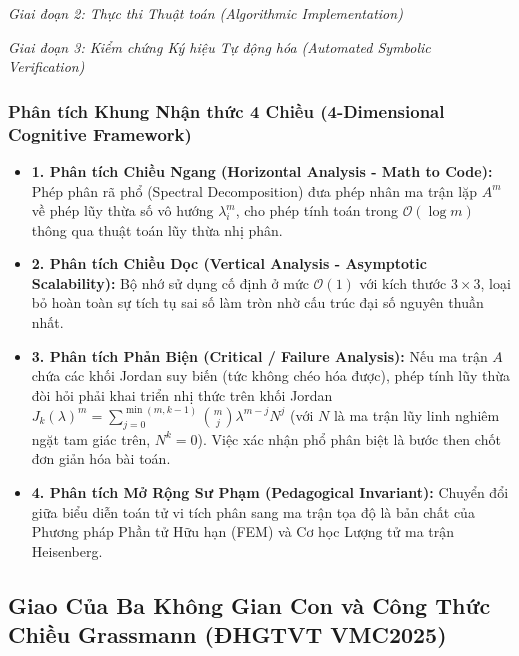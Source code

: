 \documentclass{article}
\begin{document}
\vspace{0.5em}\noindent\emph{Giai đoạn 2: Thực thi Thuật toán (Algorithmic Implementation)}


\vspace{0.5em}\noindent\emph{Giai đoạn 3: Kiểm chứng Ký hiệu Tự động hóa (Automated Symbolic Verification)}


\subsubsection*{Phân tích Khung Nhận thức 4 Chiều (4-Dimensional Cognitive Framework)}
\begin{itemize}
    \item \textbf{1. Phân tích Chiều Ngang (Horizontal Analysis - Math to Code):} Phép phân rã phổ (Spectral Decomposition) đưa phép nhân ma trận lặp $A^m$ về phép lũy thừa số vô hướng $\lambda_i^m$, cho phép tính toán trong $\mathcal{O}(\log m)$ thông qua thuật toán lũy thừa nhị phân.
    \item \textbf{2. Phân tích Chiều Dọc (Vertical Analysis - Asymptotic Scalability):} Bộ nhớ sử dụng cố định ở mức $\mathcal{O}(1)$ với kích thước $3 \times 3$, loại bỏ hoàn toàn sự tích tụ sai số làm tròn nhờ cấu trúc đại số nguyên thuần nhất.
    \item \textbf{3. Phân tích Phản Biện (Critical / Failure Analysis):} Nếu ma trận $A$ chứa các khối Jordan suy biến (tức không chéo hóa được), phép tính lũy thừa đòi hỏi phải khai triển nhị thức trên khối Jordan $J_k(\lambda)^m = \sum_{j=0}^{\min(m, k-1)} \binom{m}{j} \lambda^{m-j} N^j$ (với $N$ là ma trận lũy linh nghiêm ngặt tam giác trên, $N^k = 0$). Việc xác nhận phổ phân biệt là bước then chốt đơn giản hóa bài toán.
    \item \textbf{4. Phân tích Mở Rộng Sư Phạm (Pedagogical Invariant):} Chuyển đổi giữa biểu diễn toán tử vi tích phân sang ma trận tọa độ là bản chất của Phương pháp Phần tử Hữu hạn (FEM) và Cơ học Lượng tử ma trận Heisenberg.
\end{itemize}

\subsection{Giao Của Ba Không Gian Con và Công Thức Chiều Grassmann (ĐHGTVT VMC2025)}
\end{document}
